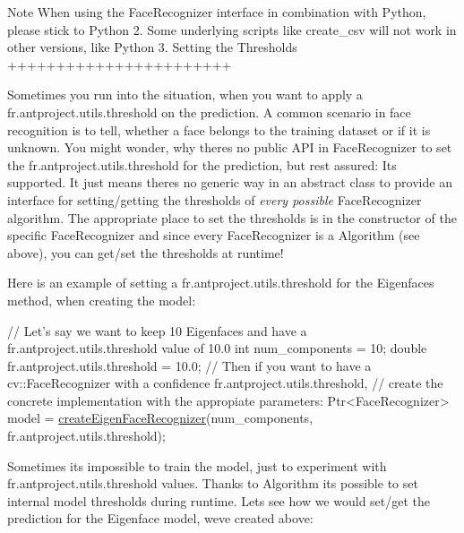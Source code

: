 \begin{DoxyNote}{Note}
When using the Face\+Recognizer interface in combination with Python, please stick to Python 2. Some underlying scripts like create\+\_\+csv will not work in other versions, like Python 3. Setting the Thresholds +++++++++++++++++++++++ 
\end{DoxyNote}
Sometimes you run into the situation, when you want to apply a fr.antproject.utils.threshold on the prediction. A common scenario in face recognition is to tell, whether a face belongs to the training dataset or if it is unknown. You might wonder, why there\textquotesingle{}s no public A\+PI in Face\+Recognizer to set the fr.antproject.utils.threshold for the prediction, but rest assured\+: It\textquotesingle{}s supported. It just means there\textquotesingle{}s no generic way in an abstract class to provide an interface for setting/getting the thresholds of {\itshape every possible} Face\+Recognizer algorithm. The appropriate place to set the thresholds is in the constructor of the specific Face\+Recognizer and since every Face\+Recognizer is a Algorithm (see above), you can get/set the thresholds at runtime!

Here is an example of setting a fr.antproject.utils.threshold for the Eigenfaces method, when creating the model\+:


\begin{DoxyPre}
\begin{DoxyCode}
\textcolor{comment}{// Let's say we want to keep 10 Eigenfaces and have a fr.antproject.utils.threshold value of 10.0}
\textcolor{keywordtype}{int} num\_components = 10;
\textcolor{keywordtype}{double} fr.antproject.utils.threshold = 10.0;
\textcolor{comment}{// Then if you want to have a cv::FaceRecognizer with a confidence fr.antproject.utils.threshold,}
\textcolor{comment}{// create the concrete implementation with the appropiate parameters:}
Ptr<FaceRecognizer> model = \hyperlink{group__face_ga6f3a56396530d46af3fba9ad04fc80cf}{createEigenFaceRecognizer}(num\_components, fr.antproject.utils.threshold);
\end{DoxyCode}
 \end{DoxyPre}
 

Sometimes it\textquotesingle{}s impossible to train the model, just to experiment with fr.antproject.utils.threshold values. Thanks to Algorithm it\textquotesingle{}s possible to set internal model thresholds during runtime. Let\textquotesingle{}s see how we would set/get the prediction for the Eigenface model, we\textquotesingle{}ve created above\+:


